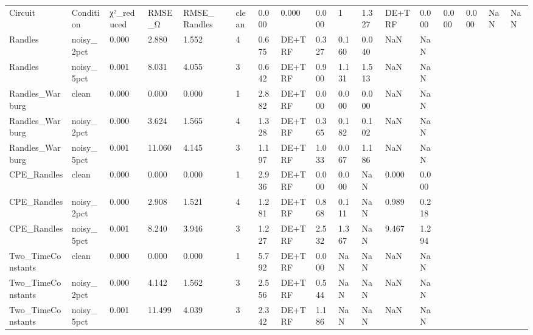 \begin{tabular}{lllllllllllll}
\toprule
Circuit & Condition & χ²_reduced & RMSE_Ω & RMSE_%
\midrule
Randles & clean & 0.000 & 0.000 & 0.000 & 1 & 1.327 & DE+TRF & 0.000 & 0.000 & 0.000 & NaN & NaN \\
Randles & noisy_2pct & 0.000 & 2.880 & 1.552 & 4 & 0.675 & DE+TRF & 0.327 & 0.160 & 0.040 & NaN & NaN \\
Randles & noisy_5pct & 0.001 & 8.031 & 4.055 & 3 & 0.642 & DE+TRF & 0.900 & 1.131 & 1.513 & NaN & NaN \\
Randles_Warburg & clean & 0.000 & 0.000 & 0.000 & 1 & 2.882 & DE+TRF & 0.000 & 0.000 & 0.000 & NaN & NaN \\
Randles_Warburg & noisy_2pct & 0.000 & 3.624 & 1.565 & 4 & 1.328 & DE+TRF & 0.365 & 0.182 & 0.102 & NaN & NaN \\
Randles_Warburg & noisy_5pct & 0.001 & 11.060 & 4.145 & 3 & 1.197 & DE+TRF & 1.033 & 0.067 & 1.186 & NaN & NaN \\
CPE_Randles & clean & 0.000 & 0.000 & 0.000 & 1 & 2.936 & DE+TRF & 0.000 & 0.000 & NaN & 0.000 & 0.000 \\
CPE_Randles & noisy_2pct & 0.000 & 2.908 & 1.521 & 4 & 1.281 & DE+TRF & 0.868 & 0.111 & NaN & 0.989 & 0.218 \\
CPE_Randles & noisy_5pct & 0.001 & 8.240 & 3.946 & 3 & 1.227 & DE+TRF & 2.532 & 1.367 & NaN & 9.467 & 1.294 \\
Two_TimeConstants & clean & 0.000 & 0.000 & 0.000 & 1 & 5.792 & DE+TRF & 0.000 & NaN & NaN & NaN & NaN \\
Two_TimeConstants & noisy_2pct & 0.000 & 4.142 & 1.562 & 3 & 2.556 & DE+TRF & 0.544 & NaN & NaN & NaN & NaN \\
Two_TimeConstants & noisy_5pct & 0.001 & 11.499 & 4.039 & 3 & 2.342 & DE+TRF & 1.186 & NaN & NaN & NaN & NaN \\
\bottomrule
\end{tabular}
